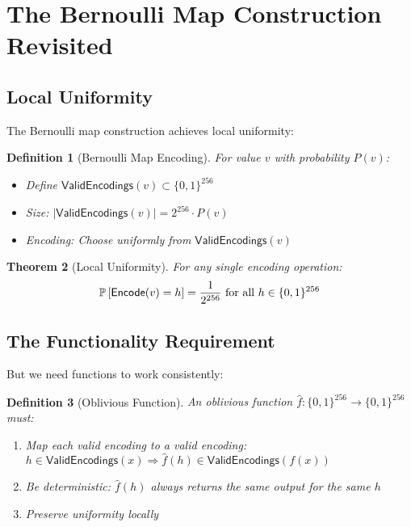 \documentclass[11pt,final]{article}
\newcommand{\ValidEnc}{\mathsf{ValidEncodings}}
\newcommand{\Encode}{\mathsf{Encode}}
\newcommand{\HashSpace}{\{0,1\}^{256}}
\newtheorem{theorem}{Theorem}[section]
\newtheorem{definition}[theorem]{Definition}
\begin{document}
\section{The Bernoulli Map Construction Revisited}

\subsection{Local Uniformity}

The Bernoulli map construction achieves local uniformity:

\begin{definition}[Bernoulli Map Encoding]
For value $v$ with probability $P(v)$:
\begin{itemize}
    \item Define $\ValidEnc(v) \subset \HashSpace$
    \item Size: $|\ValidEnc(v)| = 2^{256} \cdot P(v)$
    \item Encoding: Choose uniformly from $\ValidEnc(v)$
\end{itemize}
\end{definition}

\begin{theorem}[Local Uniformity]
For any single encoding operation:
\begin{equation}
\Prob{\Encode(v) = h} = \frac{1}{2^{256}} \text{ for all } h \in \HashSpace
\end{equation}
\end{theorem}

\subsection{The Functionality Requirement}

But we need functions to work consistently:

\begin{definition}[Oblivious Function]
An oblivious function $\hat{f}: \HashSpace \to \HashSpace$ must:
\begin{enumerate}
    \item Map each valid encoding to a valid encoding: $h \in \ValidEnc(x) \Rightarrow \hat{f}(h) \in \ValidEnc(f(x))$
    \item Be deterministic: $\hat{f}(h)$ always returns the same output for the same $h$
    \item Preserve uniformity locally
\end{enumerate}
\end{definition}
\end{document}

